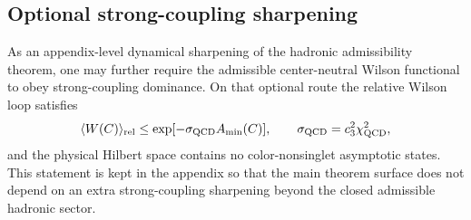 \subsection{Optional strong-coupling sharpening}

As an appendix-level dynamical sharpening of the hadronic admissibility theorem, one may further require the
admissible center-neutral Wilson functional to obey strong-coupling dominance. On that optional
route the relative Wilson loop satisfies
\[
\langle W(C)\rangle_{\mathrm{rel}}
\le
\exp[-\sigma_{\mathrm{QCD}} A_{\min}(C)],
\qquad
\sigma_{\mathrm{QCD}}=c_3^2\chi_{\mathrm{QCD}}^2,
\]
and the physical Hilbert space contains no color-nonsinglet asymptotic states. This statement is
kept in the appendix so that the main theorem surface does not depend on an extra strong-coupling
sharpening beyond the closed admissible hadronic sector.

